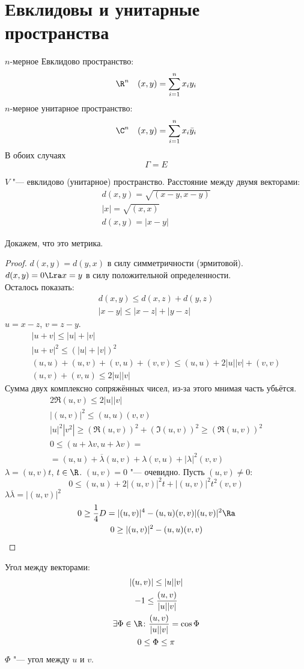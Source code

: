 \section{Евклидовы и унитарные пространства}

\begin{Def}
	$n$-мерное Евклидово пространство:
	\[ \R^n \quad (x, y) = \sum_{i=1}^n x_iy_i \]
	$n$-мерное унитарное пространство:
	\[ \C^n \quad (x, y) = \sum_{i=1}^n x_i \bar y_i \]
	В обоих случаях
	\[ \Gamma = E \]
\end{Def}

\begin{Def}
	$V$ "--- евклидово (унитарное) пространство.
	Расстояние между двумя векторами:
	\begin{gather*}
		d(x, y) = \sqrt{(x - y, x - y)} \\
		|x| = \sqrt{(x, x)} \\
		d(x, y) = |x - y|
	\end{gather*}
\end{Def}

Докажем, что это метрика.
\begin{proof}
	$d(x, y) = d(y, x)$ в силу симметричности (эрмитовой). \\
	$d(x, y) = 0 \Lra x = y$ в силу положительной определенности. \\
	Осталось показать:
	\begin{gather*}
		d(x, y) \le d(x, z) + d(y, z) \\
		|x - y| \le |x - z| + |y - z|
	\end{gather*}
	$u = x - z$, $v = z - y$.
	\begin{gather*}
		|u + v| \le |u| + |v| \\
		|u + v|^2 \le (|u| + |v|)^2 \\
		(u, u) + (u, v) + (v, u) + (v, v) \le (u, u) + 2|u||v| + (v, v) \\
		(u, v) + (v, u) \le 2|u||v|
	\end{gather*}
	Сумма двух комплексно сопряжённых чисел, из-за этого мнимая часть убьётся.
	\begin{gather*}
		2\Re(u, v) \le 2|u||v| \\
		|(u, v)|^2 \le (u, u)(v, v) \\
		|u|^2 |v^2| \ge (\Re(u, v))^2 + (\Im(u, v))^2 \ge (\Re(u,v))^2 \\
		0 \le (u + \lambda v, u + \lambda v) =  \\
		= (u, u) + \overline{\lambda}(u, v) + \lambda(v, u) + |\lambda|^2(v, v)
	\end{gather*}
	$\lambda = (u, v)t$, $t \in \R$.
	$(u, v) = 0$ "--- очевидно.
	Пусть $(u, v) \ne 0$:
	\[
		0 \le (u, u) + 2|(u, v)|^2t + |(u, v)|^2t^2(v, v)
	\]
	$\lambda\overline{\lambda} = |(u, v)|^2$
	\begin{gather*}
		0 \ge \frac{1}{4}D = |(u,v)|^4 - (u, u)(v, v)|(u, v)|^2 \Ra \\
		0 \ge |(u, v)|^2 - (u, u)(v, v)
	\end{gather*}
\end{proof}

\begin{Def}
	Угол между векторами:
	\begin{gather*}
		|(u, v)| \le |u||v| \\
		-1 \le \frac{(u, v)}{|u||v|} \\
		\exists \Phi \in \R\colon \frac{(u,v)}{|u||v|} = \cos \Phi \\
		0 \le \Phi \le \pi
	\end{gather*}
	$\Phi$ "--- угол между $u$ и $v$.
\end{Def}
